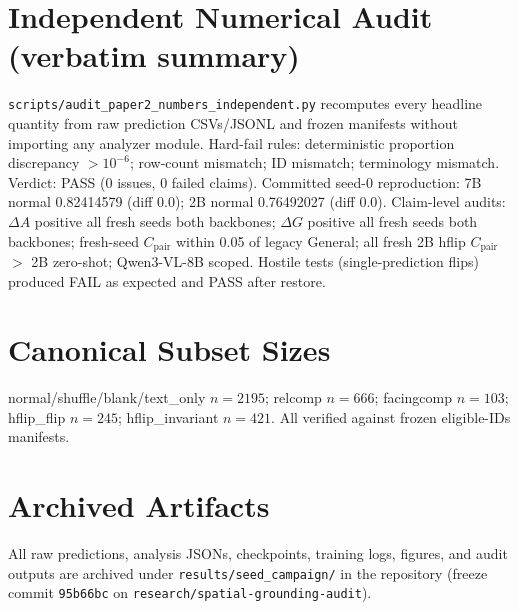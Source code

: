 \documentclass[10pt,twocolumn,letterpaper]{article}
\newcommand{\qwennew}{Qwen3-VL-8B}
\newcommand{\dA}{$\Delta A$}
\newcommand{\dG}{$\Delta G$}
\begin{document}
\section{Independent Numerical Audit (verbatim summary)}
\texttt{scripts/audit\_paper2\_numbers\_independent.py} recomputes every
headline quantity from raw prediction CSVs/JSONL and frozen manifests
without importing any analyzer module. Hard-fail rules: deterministic
proportion discrepancy $> 10^{-6}$; row-count mismatch; ID mismatch;
terminology mismatch. Verdict: PASS (0 issues, 0 failed claims).
Committed seed-0 reproduction: 7B normal 0.82414579 (diff 0.0);
2B normal 0.76492027 (diff 0.0). Claim-level audits: \dA{} positive all
fresh seeds both backbones; \dG{} positive all fresh seeds both backbones;
fresh-seed $C_{\text{pair}}$ within 0.05 of legacy General; all fresh 2B
hflip $C_{\text{pair}}$ $>$ 2B zero-shot; \qwennew{} scoped. Hostile tests
(single-prediction flips) produced FAIL as expected and PASS after restore.

\section{Canonical Subset Sizes}
normal/shuffle/blank/text\_only $n{=}2195$; relcomp $n{=}666$;
facingcomp $n{=}103$; hflip\_flip $n{=}245$; hflip\_invariant $n{=}421$.
All verified against frozen eligible-IDs manifests.

\section{Archived Artifacts}
All raw predictions, analysis JSONs, checkpoints, training logs, figures,
and audit outputs are archived under \texttt{results/seed\_campaign/} in
the repository (freeze commit \texttt{95b66bc} on
\texttt{research/spatial-grounding-audit}).
\end{document}
